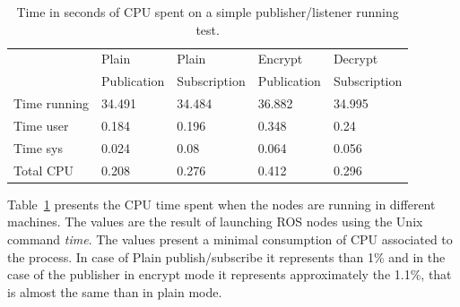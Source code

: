 \documentclass[journal,twoside]{JoPhA}
\begin{document}
\begin{table}[h]
	\centering
	\caption{Time in seconds of CPU spent on a simple publisher/listener running test.}
	\label{tab:time_simple_text_hellow_CPU}
	\begin{tabular}{|l|l|l|l|l|}
		\hline
		&		Plain&	Plain&	Encrypt&	Decrypt \\
		&		Publication&Subscription&Publication&Subscription \\\hline
		Time running&34.491&	34.484&	36.882&	34.995 \\\hline
		Time user&0.184&	0.196&	0.348&	0.24 \\\hline
		Time sys&0.024&	0.08&	0.064&	0.056 \\\hline
		Total CPU&0.208&	0.276&	0.412&	0.296 \\\hline
		
	\end{tabular}
\end{table}

Table~\ref{tab:time_simple_text_hellow_CPU} presents the CPU time spent when the nodes are running in different machines.  The values are the result of launching ROS nodes using the Unix command {\em time}. The values present a minimal consumption of CPU associated to the process. In  case of Plain publish/subscribe it represents than 1\% and in the case of the publisher in encrypt mode it represents approximately the 1.1\%, that is almost the same than in plain mode.

\end{document}
